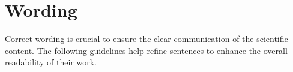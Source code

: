\chapter{Wording}
\label{ch:wording}

Correct wording is crucial to ensure the clear communication of the scientific content.
The following guidelines help refine sentences to enhance the overall readability of their work.













